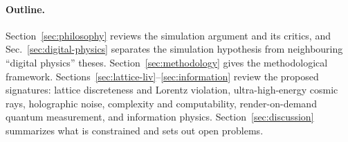 \paragraph{Outline.} Section~\ref{sec:philosophy} reviews the simulation argument and its critics, and Sec.~\ref{sec:digital-physics} separates the simulation hypothesis from neighbouring ``digital physics'' theses. Section~\ref{sec:methodology} gives the methodological framework. Sections~\ref{sec:lattice-liv}--\ref{sec:information} review the proposed signatures: lattice discreteness and Lorentz violation, ultra-high-energy cosmic rays, holographic noise, complexity and computability, render-on-demand quantum measurement, and information physics. Section~\ref{sec:discussion} summarizes what is constrained and sets out open problems.
